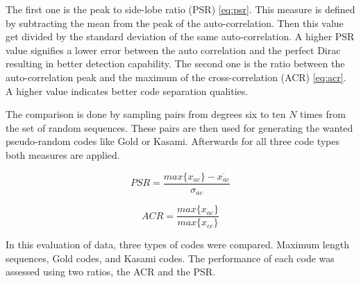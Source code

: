 The first one is the peak to side-lobe ratio (PSR) \ref{eq:psr}. This measure is defined by subtracting the mean from the peak of the auto-correlation. Then this value get divided by the standard deviation of the same auto-correlation. A higher PSR value signifies a lower error between the auto correlation and the perfect Dirac resulting in better detection capability. The second one is the ratio between the auto-correlation peak and the maximum of the cross-correlation (ACR) \ref{eq:acr}. A higher value indicates better code separation qualities.

The comparison is done by sampling pairs from degrees six to ten $N$ times from the set of random sequences. These pairs are then used for generating the wanted pseudo-random codes like Gold or Kasami. Afterwards for all three code types both measures are applied.  


\begin{equation}
PSR=\dfrac{max\{x_{ac}\}-\overline{x_{ac}}}{\sigma_{ac}}
\label{eq:psr}
\end{equation}

\begin{equation}
ACR=\dfrac{max\{x_{ac}\}}{max\{{x_{cc}\}}}
\label{eq:acr}
\end{equation}

%
%
%
%
%
In this evaluation of data, three types of codes were compared. Maximum length sequences, Gold codes, and Kasami codes. The performance of each code was assessed using two ratios, the ACR and the PSR.

